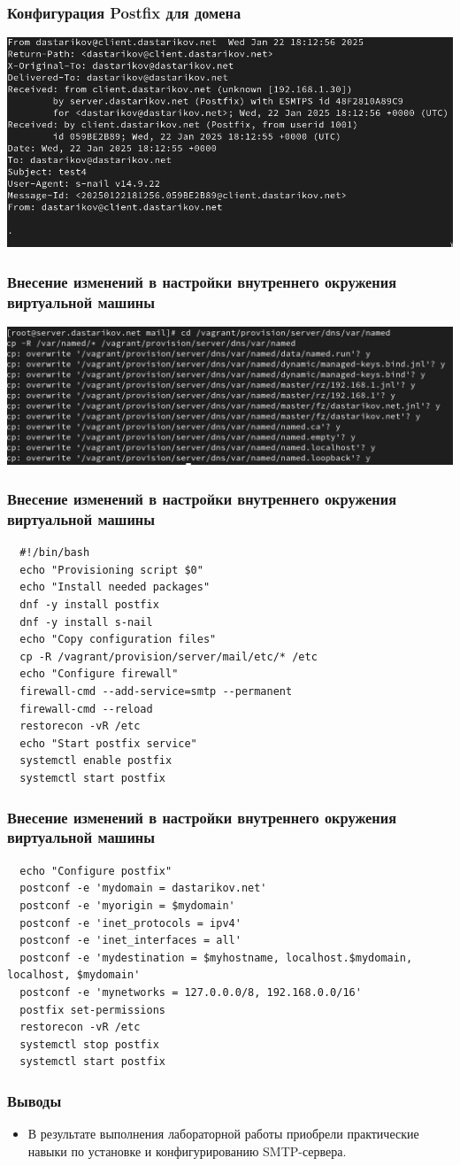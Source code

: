 \begin{frame}
\frametitle{Конфигурация Postfix для домена}
    \centering
    \includegraphics[width=\textwidth]{../images/image27.png}
\end{frame}
\begin{frame}
\frametitle{Внесение изменений в настройки внутреннего окружения виртуальной машины}
    \centering
    \includegraphics[width=\textwidth]{../images/image28.png}
\end{frame}
\begin{frame}[containsverbatim]
\frametitle{Внесение изменений в настройки внутреннего окружения виртуальной машины}
\begin{verbatim}
  #!/bin/bash
  echo "Provisioning script $0"
  echo "Install needed packages"
  dnf -y install postfix
  dnf -y install s-nail
  echo "Copy configuration files"
  cp -R /vagrant/provision/server/mail/etc/* /etc
  echo "Configure firewall"
  firewall-cmd --add-service=smtp --permanent
  firewall-cmd --reload
  restorecon -vR /etc
  echo "Start postfix service"
  systemctl enable postfix
  systemctl start postfix
\end{verbatim}
\end{frame}
\begin{frame}[containsverbatim]
\frametitle{Внесение изменений в настройки внутреннего окружения виртуальной машины}
\begin{verbatim}
  echo "Configure postfix"
  postconf -e 'mydomain = dastarikov.net'
  postconf -e 'myorigin = $mydomain'
  postconf -e 'inet_protocols = ipv4'
  postconf -e 'inet_interfaces = all'
  postconf -e 'mydestination = $myhostname, localhost.$mydomain, localhost, $mydomain'
  postconf -e 'mynetworks = 127.0.0.0/8, 192.168.0.0/16'
  postfix set-permissions
  restorecon -vR /etc
  systemctl stop postfix
  systemctl start postfix
\end{verbatim}
\end{frame}
\begin{frame}
\frametitle{Выводы}
\begin{itemize}
    \item В результате выполнения лабораторной работы приобрели практические навыки по установке и конфигурированию SMTP-сервера.
\end{itemize}
\end{frame}

